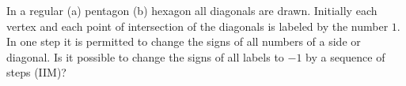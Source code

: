 In a regular (a) pentagon (b) hexagon all diagonals are drawn. Initially each vertex and each point of intersection of the diagonals is labeled by the number $1$. In one step it is permitted to change the signs of all numbers of a side or diagonal. Is it possible to change the signs of all labels to $-1$ by a sequence of steps (IIM)?
